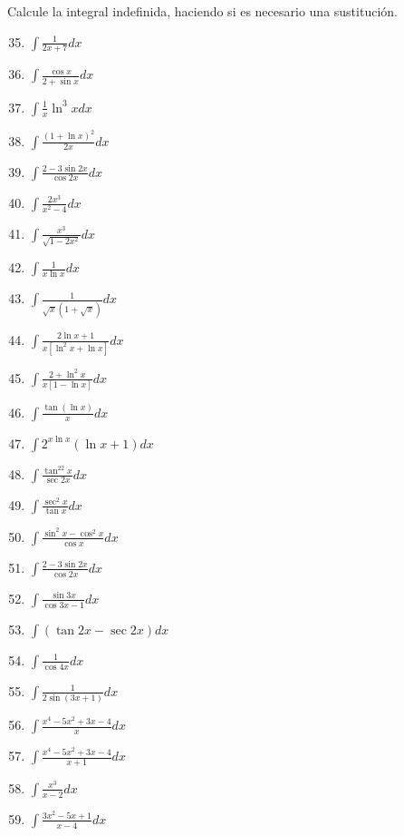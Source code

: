 {Calcule la integral indefinida, haciendo si es necesario una sustitución.
\begin{multicols}{2}
\begin{enumerate}
\setcounter{enumi}{34}
\item $\displaystyle\int \frac{1} {2x+7  } dx $
\item $\displaystyle\int \frac{\cos x} {2+\sin x  } dx $
\item $\displaystyle\int \frac{1} {x} \ln^3 x dx $
\item $\displaystyle\int \frac{(1+\ln x)^2} {2x  } dx $
\item $\displaystyle\int \frac{2-3\sin2x}{\cos 2x} dx$
\item $\displaystyle\int \frac{2x^3}{x^2 -4} dx$
\item $\displaystyle\int \frac{x^3}{\sqrt{1-2x^2}} dx$
\item $\displaystyle\int \frac{1}{x\ln x} dx$
\item $\displaystyle\int \frac{1}{\sqrt{x}(1+\sqrt{ x})} dx$
\item $\displaystyle\int \frac{2\ln x+ 1}{x[\ln^2 x+\ln x]} dx$
\item $\displaystyle\int \frac{2+\ln^2 x}{x[1-\ln x]} dx$
\item $\displaystyle\int \frac{\tan(\ln x)}{x} dx$
\item $\displaystyle\int 2 ^{x\ln x}(\ln x+1)dx$
\item $\displaystyle\int \frac{\tan ^22x}{\sec 2x} dx$
\item $\displaystyle\int \frac{\sec^2x}{\tan x} dx$
\item $\displaystyle\int \frac{\sin^2x-\cos^2x}{\cos x} dx$
\item $\displaystyle\int \frac{2-3\sin2x}{\cos 2x} dx$
\item $\displaystyle\int \frac{\sin 3x}{\cos 3x-1} dx$
\item $\displaystyle\int (\tan 2x -\sec 2x) dx$
\item $\displaystyle\int \frac{1}{\cos4x} dx$
\item $\displaystyle\int \frac{1}{2\sin(3x+1)} dx$
\item $\displaystyle\int \frac{x^4-5x^2+3x-4} {x  } dx $
\item $\displaystyle\int \frac{x^4-5x^2+3x-4} {x+1} dx $
\item $\displaystyle\int \frac{x^3} {x-2} dx $
\item $\displaystyle\int \frac{3x^2-5x+1} {x-4} dx $
\end{enumerate}
\end{multicols} 

}
